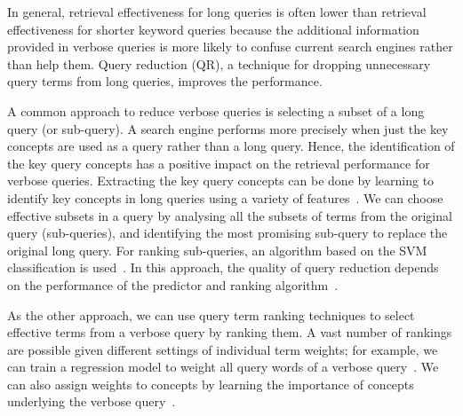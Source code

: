 In general, retrieval effectiveness for long queries is often lower than retrieval effectiveness for shorter keyword queries because the additional information provided in verbose queries is more likely to confuse current search engines rather than help them. Query reduction (QR), a technique for dropping unnecessary query terms from long queries, improves the performance. 

A common approach to reduce verbose queries is selecting a subset of a long query (or sub-query). A search engine performs more precisely when just the key concepts are used as a query rather than a long query. Hence, the identification of the key query concepts has a positive impact on the retrieval performance for verbose queries. Extracting the key query concepts can be done by learning to identify key concepts in long queries using a variety of features~\citep{bendersky2008discovering}. We can choose effective subsets in a query by analysing all the subsets of terms from the original query (sub-queries), and identifying the most promising sub-query to replace the original long query. For ranking sub-queries, an algorithm based on the SVM classification is used~\citep{kumaran2009reducing}. In this approach, the quality of query reduction depends on the performance of the predictor and ranking algorithm~\citep{balasubramanian2010exploring}. 

As the other approach, we can use query term ranking techniques to select effective terms from a verbose query by ranking them. A vast number of rankings are possible given different settings of individual term weights; for example, we can train a regression model to weight all query words of a verbose query~\citep{lease2009regression}. We can also assign weights to concepts by learning the importance of concepts underlying
the verbose query~\citep{bendersky2010learning}.
